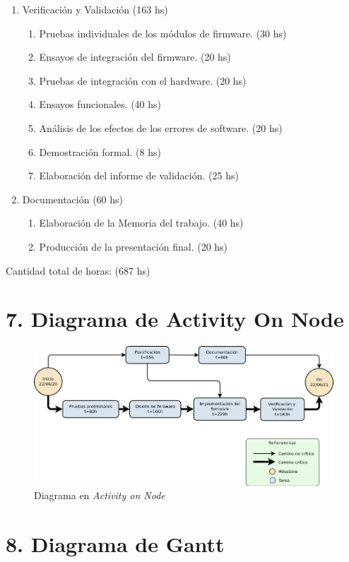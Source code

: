 \documentclass[11pt]{charter}
\begin{document}
\begin{enumerate}
\begin{enumerate}
	\end{enumerate}
\item Verificación y Validación \hfill (163 hs)
	\begin{enumerate}
	\item Pruebas individuales de los módulos de firmware.  \hfill (30 hs)
	\item Ensayos de integración del firmware.  \hfill (20 hs)
	\item Pruebas de integración con el hardware. \hfill (20 hs)
	\item Ensayos funcionales. \hfill (40 hs)
	\item Análisis de los efectos de los errores de software. \hfill (20 hs)
	\item Demostración formal. \hfill (8 hs)
	\item Elaboración del informe de validación. \hfill (25 hs)
	\end{enumerate}
\item Documentación \hfill (60 hs)
	\begin{enumerate}
	\item Elaboración de la Memoria del trabajo. \hfill (40 hs)
	\item Producción de la presentación final. \hfill (20 hs)
	\end{enumerate}
\end{enumerate}

Cantidad total de horas: (687 hs)

\section{7. Diagrama de Activity On Node}
\label{sec:AoN}

\begin{figure}[H]
\centering 
\includegraphics[width=.8\textwidth]{./Figuras/AoN2.png}
\caption{Diagrama en \textit{Activity on Node}}
\label{fig:AoN}
\end{figure}

\section{8. Diagrama de Gantt}
\label{sec:gantt}
\end{document}
